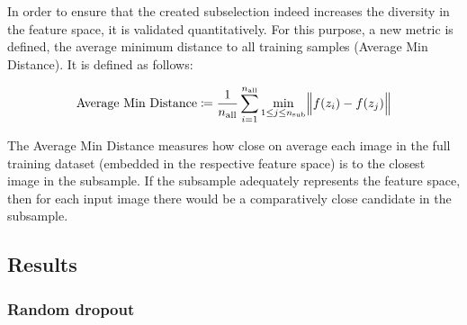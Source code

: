 In order to ensure that the created subselection indeed increases the diversity in the feature space, it is validated quantitatively. For this purpose, a new metric is defined, the average minimum distance to all training samples (Average Min Distance). It is defined as follows:

\[
\text{Average Min Distance}
\coloneq \frac{1}{n_{\text{all}}}
  \sum_{i=1}^{n_{\text{all}}}
    \min_{1 \le j \le n_{\text{sub}}}
      \Bigl\lVert f(z_i) - f(z_j) \Bigr\rVert
\]

\noindent{}

The Average Min Distance measures how close on average each image in the full training dataset (embedded in the respective feature space) is to the closest image in the subsample. If the subsample adequately represents the feature space, then for each input image there would be a comparatively close candidate in the subsample. 

\subsection{Results}



\subsubsection{Random dropout}

